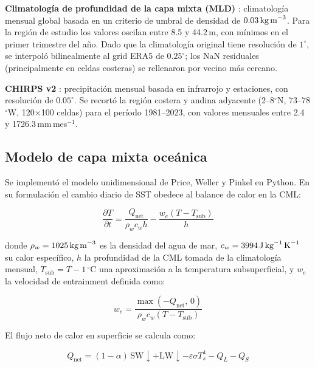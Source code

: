 \documentclass[12pt, a4paper]{article}
\begin{document}
\textbf{Climatolog\'ia de profundidad de la capa mixta (MLD)} 
\cite{deBoyer2004, deBoyer2024}: climatolog\'ia mensual global basada en un criterio de 
umbral de densidad de $0.03\,\text{kg\,m}^{-3}$. Para la regi\'on de estudio los valores 
oscilan entre 8.5 y 44.2\,m, con m\'inimos en el primer trimestre del a\~no. Dado que la 
climatolog\'ia original tiene resoluci\'on de $1^{\circ}$, se interpol\'o bilinealmente 
al grid ERA5 de $0.25^{\circ}$; los NaN residuales (principalmente en celdas costeras) 
se rellenaron por vecino m\'as cercano.

\textbf{CHIRPS v2} \cite{Funk2015}: precipitaci\'on mensual basada en infrarrojo y 
estaciones, con resoluci\'on de $0.05^{\circ}$. Se recort\'o la regi\'on costera y andina 
adyacente (2--8$^{\circ}$N, 73--78$^{\circ}$W, 120$\times$100 celdas) para el per\'iodo 
1981--2023, con valores mensuales entre 2.4 y 1726.3\,mm\,mes$^{-1}$.

\subsection{Modelo de capa mixta oce\'anica}

Se implement\'o el modelo unidimensional de Price, Weller y Pinkel 
\cite{Price1986} en Python. En su formulaci\'on el cambio diario de SST obedece al 
balance de calor en la CML:

\begin{equation}
	\frac{\partial T}{\partial t} = \frac{Q_\text{net}}{\rho_w c_w h} - 
	\frac{w_e \left(T - T_\text{sub}\right)}{h}
	\label{eq:pwp}
\end{equation}

\noindent donde $\rho_w = 1025\,\text{kg\,m}^{-3}$ es la densidad del agua de mar, 
$c_w = 3994\,\text{J\,kg}^{-1}\,\text{K}^{-1}$ su calor espec\'ifico, $h$ la 
profundidad de la CML tomada de la climatolog\'ia mensual, $T_\text{sub} = T - 1\,^\circ$C 
una aproximaci\'on a la temperatura subsuperficial, y $w_e$ la velocidad de entrainment 
definida como:

\begin{equation}
	w_e = \frac{\max(-Q_\text{net},\, 0)}{\rho_w c_w \left(T - T_\text{sub}\right)}
	\label{eq:we}
\end{equation}

El flujo neto de calor en superficie se calcula como:

\begin{equation}
	Q_\text{net} = (1 - \alpha)\,\text{SW}{\downarrow} + 
	\text{LW}{\downarrow} - \varepsilon\sigma T_s^4 - Q_L - Q_S
	\label{eq:qnet}
\end{equation}
\end{document}
